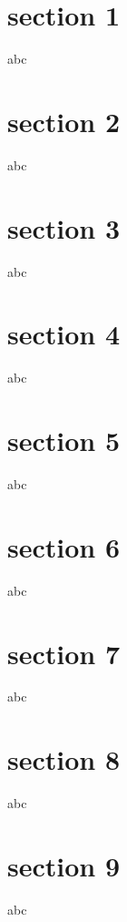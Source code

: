 \documentclass{beamer}
\begin{document}
	
\section{section 1}
\begin{frame}
	abc
\end{frame}	
	
\section{section 2}
\begin{frame}
	abc
\end{frame}	

\section{section 3}
\begin{frame}
	abc
\end{frame}	

\section{section 4}
\begin{frame}
	abc
\end{frame}	

\section{section 5}
\begin{frame}
	abc
\end{frame}	

\section{section 6}
\begin{frame}
	abc
\end{frame}	

\section{section 7}
\begin{frame}
	abc
\end{frame}	

\section{section 8}
\begin{frame}
	abc
\end{frame}	

\section{section 9}
\begin{frame}
	abc
\end{frame}	
	
	
\end{document}
